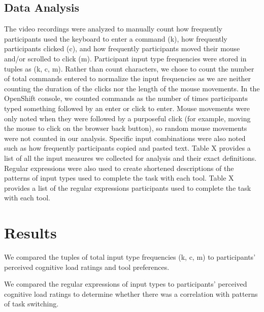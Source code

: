 \documentclass[11pt, oneside]{article}   	%
\begin{document}
\subsection{Data Analysis}
The video recordings were analyzed to manually count how frequently participants used the keyboard to enter a command (k), how frequently participants clicked (c), and how frequently participants moved their mouse and/or scrolled to click (m). Participant input type frequencies were stored in tuples as (k, c, m). Rather than count characters, we chose to count the number of total commands entered to normalize the input frequencies as we are neither counting the duration of the clicks nor the length of the mouse movements. In the OpenShift console, we counted commands as the number of times participants typed something followed by an enter or click to enter. Mouse movements were only noted when they were followed by a purposeful click (for example, moving the mouse to click on the browser back button), so random mouse movements were not counted in our analysis. Specific input combinations were also noted such as how frequently participants copied and pasted text. Table X provides a list of all the input measures we collected for analysis and their exact definitions. Regular expressions were also used to create shortened descriptions of the patterns of input types used to complete the task with each tool. Table X provides a list of the regular expressions participants used to complete the task with each tool. 

\section{Results}
We compared the tuples of total input type frequencies (k, c, m) to participants' perceived cognitive load ratings and tool preferences. 

We compared the regular expressions of input types to participants' perceived cognitive load ratings to determine whether there was a correlation with patterns of task switching.
\end{document}
